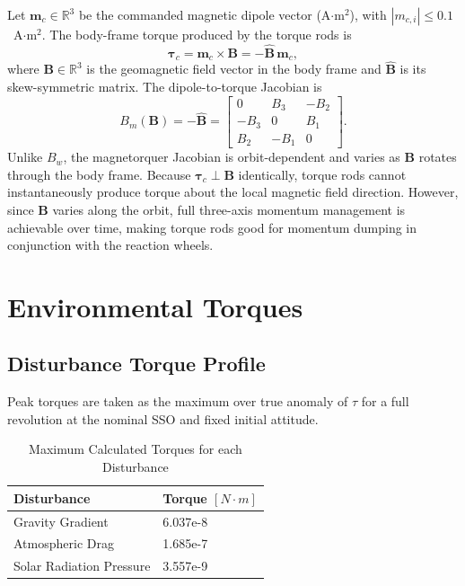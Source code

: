 Let $\mathbf{m}_c \in \mathbb{R}^3$ be the commanded magnetic dipole vector
(A$\cdot$m$^2$), with $|m_{c,i}| \leq 0.1$~A$\cdot$m$^2$.
The body-frame torque produced by the torque rods is
\begin{equation}
    \boldsymbol{\tau}_c = \mathbf{m}_c \times \mathbf{B}
                        = -\hat{\mathbf{B}}\,\mathbf{m}_c,
\end{equation}
where $\mathbf{B} \in \mathbb{R}^3$ is the geomagnetic field vector in the body
frame and $\hat{\mathbf{B}}$ is its skew-symmetric matrix.
The dipole-to-torque Jacobian is
\begin{equation}
    B_m(\mathbf{B}) = -\hat{\mathbf{B}}
    = \begin{bmatrix}
         0   &  B_3 & -B_2 \\
        -B_3 &  0   &  B_1 \\
         B_2 & -B_1 &  0
      \end{bmatrix}.
\end{equation}
Unlike $B_w$, the magnetorquer Jacobian is orbit-dependent and varies as $\mathbf{B}$ rotates through the body frame.
Because $\boldsymbol{\tau}_c \perp \mathbf{B}$ identically, torque rods cannot
instantaneously produce torque about the local magnetic field direction.
However, since $\mathbf{B}$ varies along the orbit, full three-axis momentum
management is achievable over time, making torque rods good for
momentum dumping in conjunction with the reaction wheels.

\section{Environmental Torques}
\label{sec:environmental_torques}
\subsection{Disturbance Torque Profile}
Peak torques are taken as the maximum over true anomaly of $\tau$ for a full revolution at the nominal SSO and fixed initial attitude.


\begin{table}[H]
\centering
\caption{Maximum Calculated Torques for each Disturbance}

\label{tab:torques}
\begin{tabular}{ll}
\hline
\textbf{Disturbance} & \textbf{Torque $[N\cdot m]$} \\
\hline
Gravity Gradient               & 6.037e-8 \\
Atmospheric Drag & 1.685e-7\\
Solar Radiation Pressure                      & 3.557e-9 \\
\hline
\end{tabular}
\end{table}

